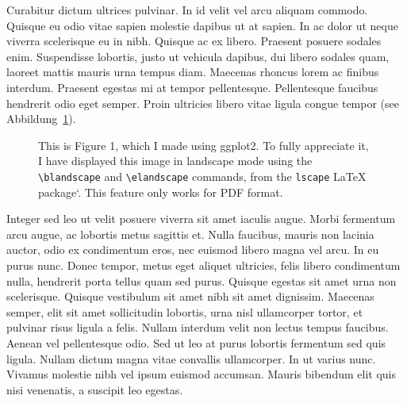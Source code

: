 \documentclass[
  12pt,
  a4paperpaper,
  a4paper]{scrreprt}
\newcommand{\blandscape}{\begin{landscape}}
\newcommand{\elandscape}{\end{landscape}}
\begin{document}
Curabitur dictum ultrices pulvinar. In id velit vel arcu aliquam
commodo. Quisque eu odio vitae sapien molestie dapibus ut at sapien. In
ac dolor ut neque viverra scelerisque eu in nibh. Quisque ac ex libero.
Praesent posuere sodales enim. Suspendisse lobortis, justo ut vehicula
dapibus, dui libero sodales quam, laoreet mattis mauris urna tempus
diam. Maecenas rhoncus lorem ac finibus interdum. Praesent egestas mi at
tempor pellentesque. Pellentesque faucibus hendrerit odio eget semper.
Proin ultricies libero vitae ligula congue tempor (see
Abbildung~\ref{fig-1}).

\blandscape

\begin{figure}


\caption{\label{fig-1}This is Figure 1, which I made using ggplot2. To
fully appreciate it, I have displayed this image in landscape mode using
the \texttt{\textbackslash{}blandscape} and
\texttt{\textbackslash{}elandscape} commands, from the \texttt{lscape}
LaTeX package`. This feature only works for PDF format.}

\end{figure}%

\elandscape

Integer sed leo ut velit posuere viverra sit amet iaculis augue. Morbi
fermentum arcu augue, ac lobortis metus sagittis et. Nulla faucibus,
mauris non lacinia auctor, odio ex condimentum eros, nec euismod libero
magna vel arcu. In eu purus nunc. Donec tempor, metus eget aliquet
ultricies, felis libero condimentum nulla, hendrerit porta tellus quam
sed purus. Quisque egestas sit amet urna non scelerisque. Quisque
vestibulum sit amet nibh sit amet dignissim. Maecenas semper, elit sit
amet sollicitudin lobortis, urna nisl ullamcorper tortor, et pulvinar
risus ligula a felis. Nullam interdum velit non lectus tempus faucibus.
Aenean vel pellentesque odio. Sed ut leo at purus lobortis fermentum sed
quis ligula. Nullam dictum magna vitae convallis ullamcorper. In ut
varius nunc. Vivamus molestie nibh vel ipsum euismod accumsan. Mauris
bibendum elit quis nisi venenatis, a suscipit leo egestas.
\end{document}
